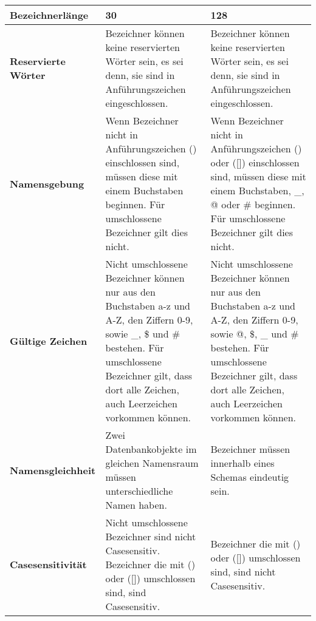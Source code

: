         \begin{center}
          \label{createtablerestrictions}
          \begin{small}
            \tabletail{
              \hline
            }
            \tablelasttail{
              \hline
            }
            \begin{supertabular}{|l|p{5.5cm}|p{5.5cm}|}
              \textbf{Bezeichnerlänge} & 30 & 128\\
              \hline
              \textbf{Reservierte Wörter} & Bezeichner können keine reservierten Wörter sein, es sei denn, sie sind in Anführungszeichen  eingeschlossen. & Bezeichner können keine reservierten Wörter sein, es sei denn, sie sind in Anführungszeichen  eingeschlossen. \\
              \hline
              \textbf{Namensgebung} & Wenn Bezeichner nicht in Anführungszeichen () einschlossen sind, müssen diese mit einem Buchstaben beginnen. Für umschlossene Bezeichner gilt dies nicht. & Wenn Bezeichner nicht in Anführungszeichen () oder ([]) einschlossen sind, müssen diese mit einem Buchstaben, \_, @ oder \# beginnen. Für umschlossene Bezeichner gilt dies nicht. \\
              \hline
              \textbf{Gültige Zeichen} & Nicht umschlossene Bezeichner können nur aus den Buchstaben a-z und A-Z, den Ziffern 0-9, sowie \_, \$ und \# bestehen. Für umschlossene Bezeichner gilt, dass dort alle Zeichen, auch Leerzeichen vorkommen können. & Nicht umschlossene Bezeichner können nur aus den Buchstaben a-z und A-Z, den Ziffern 0-9, sowie @, \$, \_ und \# bestehen. Für umschlossene Bezeichner gilt, dass dort alle Zeichen, auch Leerzeichen vorkommen können. \\
              \hline
              \textbf{Namensgleichheit} & Zwei Datenbankobjekte im gleichen Namensraum müssen unterschiedliche Namen haben.  & Bezeichner müssen innerhalb eines Schemas eindeutig sein.\\
              \hline
              \textbf{Casesensitivität} & Nicht umschlossene Bezeichner sind nicht Casesensitiv. Bezeichner die mit () oder ([]) umschlossen sind, sind Casesensitiv. & Bezeichner die mit () oder ([]) umschlossen sind, sind nicht Casesensitiv. \\
            \end{supertabular}
          \end{small}
        \end{center}
